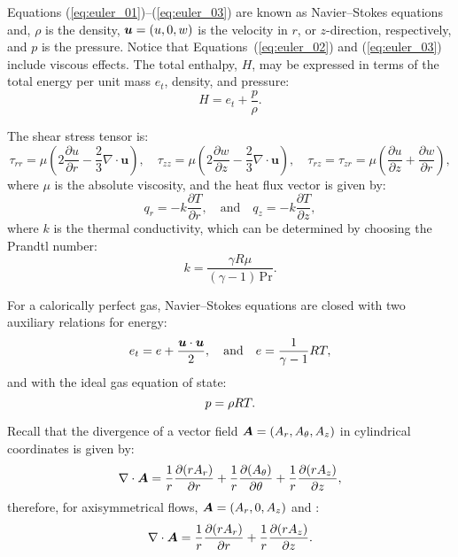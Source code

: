 \documentclass[10pt]{article}
\newcommand{\bv}[1]{\ensuremath{\mbox{\boldmath$ #1 $}}}
\newcommand{\Diff}[2] {\dfrac{\partial( #1)}{\partial #2}}
\newcommand{\diff}[2] {\dfrac{\partial #1}{\partial #2}}
\begin{document}
Equations (\ref{eq:euler_01})--(\ref{eq:euler_03}) are known as Navier--Stokes equations and, $\rho$ is the density, $\bv{u}=(u,0,w)$ is the velocity in $r$, or $z$-direction, respectively,    and $p$ is the pressure. Notice that Equations~(\ref{eq:euler_02}) and (\ref{eq:euler_03}) include viscous effects. The total enthalpy, $H$, may be expressed in terms of the total energy per unit mass $e_t$, density, and pressure:
$$H = e_t + \dfrac{p}{\rho}.$$


The shear stress tensor is:
\begin{equation}
\tau_{rr}=  \mu \left( 2 \diff{u}{r} - \dfrac{2}{3} \nabla \cdot  \mathbf{u} \right),
\quad  \tau_{zz}=  \mu \left( 2 \diff{w}{z} - \dfrac{2}{3} \nabla \cdot \mathbf{u} \right),
\quad\tau_{rz}= \tau_{zr}=\mu \left( \diff{u}{z} + \diff{w}{r}\right),
\end{equation}
where $\mu$ is the absolute viscosity, and the heat flux vector is given by:
\begin{equation}
 q_r = - k \diff{T}{r},  \quad \mbox{and} \quad q_z = - k \diff{T}{z},
 \end{equation}
where $k$ is the thermal conductivity, which can be determined by choosing the Prandtl number:
$$k= \dfrac{\gamma R \mu}{ (\gamma-1) \, \mbox{Pr} }.$$

For a calorically perfect gas, Navier--Stokes equations are closed with two auxiliary relations for energy:
\begin{equation}
 \label{eq:euler_04}
e_t= e+\dfrac{\bv{u}\cdot \bv{u}}{2},\quad\mbox{and}\quad e=\dfrac{1}{\gamma -1}RT ,
\end{equation}
and with the ideal gas equation of state:
\begin{equation}
 \label{eq:euler_05}
p=\rho RT.\\
\end{equation}


Recall that the  divergence of a vector field $\bv{A}=(A_r,A_\theta,A_z)$ in cylindrical coordinates is given by:
\begin{equation*}
 \nabla\cdot \bv{A}= \dfrac{1}{r}\Diff{r A_r}{r} +\dfrac{1}{r}\Diff{ A_\theta}{\theta} +\dfrac{1}{r}\Diff{r A_z}{z},
\end{equation*}
therefore, for axisymmetrical flows,  $\bv{A}=(A_r,0,A_z)$  and :
\begin{equation*}
 \nabla\cdot \bv{A}= \dfrac{1}{r}\Diff{r A_r}{r}  +\dfrac{1}{r}\Diff{r A_z}{z}.
\end{equation*}
\end{document}
